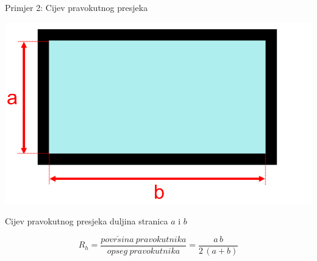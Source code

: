 \documentclass{beamer}
\begin{document}
\begin{frame}{Primjer 2: Cijev pravokutnog presjeka}

\begin{center}
\includegraphics[width=0.45\paperwidth]{slike/slika4.PNG}
\par\end{center}
\begin{example}
{Cijev pravokutnog presjeka duljina stranica $a$ i $b$}

\[
R_{h}=\frac{povr\check{s}ina\:pravokutnika}{opseg\:pravokutnika}=\frac{a\,b}{2\,(a+b)}
\]

\end{example}

\end{frame}
\end{document}
